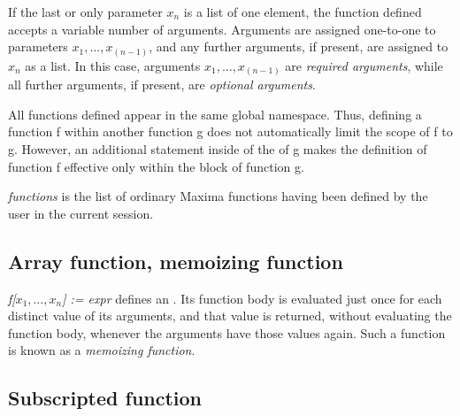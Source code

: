 \documentclass[../Maxima_Workbook.tex]{subfiles}
\begin{document}
\lz {}

\lz If the last or only parameter $ x_n $ is a list of one element, the function defined accepts a variable number of arguments. Arguments are assigned one-to-one to parameters $ x_1, \dots, x_{(n-1)} $, and any further arguments, if present, are assigned to $ x_n $ as a list. In this case, arguments $ x_1, \dots, x_{(n-1)} $ are \emph{required arguments}, while all further arguments, if present, are \emph{optional arguments}. 

\lz All functions defined appear in the same global namespace. Thus, defining a function f within another function g does not automatically limit the scope of f to g. However, an additional statement  inside of the  of g makes the definition of function f effective only within the block of function g.

\lzz {} \qquad {} \hfill {}

\lz \emph{functions} is the list of ordinary Maxima functions having been defined by the user in the current session. 

\subsection{Array function, memoizing function}\label{F3}


\lz {}




\lz \emph{ f[$x_1,\dots, x_n $] := expr} defines an . Its function body is evaluated just once for each distinct value of its arguments, and that value is returned, without evaluating the function body, whenever the arguments have those values again. Such a function is known as a \emph{memoizing function}. 

\subsection{Subscripted function}\label{F4}
\end{document}
